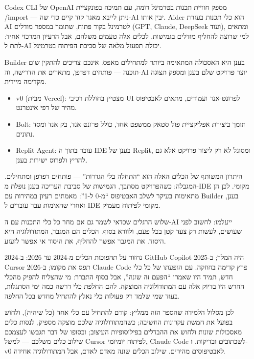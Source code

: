 
Codex CLI של OpenAI מספק חוויית תכנות בטרמינל דומה, עם תמיכה בפונקציית /import — ניתן לייבא מאגר קוד קיים כדי שה-AI יבין אותו. Aider הוא כלי תכנות בעזרת AI לטרמינל בקוד פתוח, שתומך במספר מודלים (GPT, Claude, DeepSeek ועוד), ומתאים למי שרוצה להחליף מודלים בגמישות. לכלים אלה טעמים משלהם, אבל הרעיון המרכזי אחיד: לתת ל-AI יכולת תפעול מלאה של סביבת הפיתוח בטרמינל.


Builder בענן היא האסכולה המתאימה ביותר למתחילים מאפס. אינכם צריכים להתקין שום תוכנה — פותחים דפדפן, מתארים את הדרישה, וה-AI יוצר פרויקט שלם בענן ומספק תצוגה מקדימה מיידית.

\begin{itemize}
  \item v0 (מבית Vercel): מצטיין בחוללת רכיבי UI לפרונט-אנד ועמודים, מתאים לאבטיפוס מהיר של דפי אינטרנט.
  \item Bolt: תומך ביצירת אפליקציית פול-סטאק ממשפט אחד, כולל פרונט-אנד, בק-אנד ומסד נתונים.
  \item Replit Agent: עובד בתוך ה-IDE בענן של Replit, ומסוגל לא רק ליצור פרויקט אלא גם להריץ ולפרוס ישירות בענן.
\end{itemize}

היתרון המשותף של הכלים האלה הוא “התחלה בלי הגדרות” — פותחים דפדפן ומתחילים. המגבלה: כשהפרויקט מסתבך, הגמישות של סביבת העריכה בענן נופלת מ-IDE מקומי. לכן הן מתאימות בעיקר לשלב האבטיפוס “מ-0 ל-1”: מאמתים רעיון במהירות עם Builder בענן, ואחרי שהאימות עבר עוברים ל-IDE מקומי לפיתוח מעמיק.


שלוש הרגלים שכדאי לשמר גם אם מחר כל כלי התכנות עם ה-AI ייעלמו: לחשוב לפני שעושים, לעשות רק צעד קטן בכל פעם, ולוודא בסוף. הכלים הם המגבר, המתודולוגיה היא היסוד. את המגבר אפשר להחליף, את היסוד אי אפשר לזעזע.

נחזור על תהפוכות הכלים מ-2024 עד 2026: ב-2024 GitHub Copilot היה המלך; ב-2025 Cursor תפס את מקומו; ב-2026 Claude Code פרץ קדימה בחוזקה. עם הופעתו של כל כלי חדש, תמיד היו שאמרו “הפעם זה שונה”, אבל בסוף התברר: מי שהצליח להפיק מהכלי החדש היו בדיוק אלה עם המתודולוגיה המוצקה. להם החלפת כלי דרשה כמה ימי הסתגלות, בעוד שמי שלמד רק פעולות כלי נאלץ להתחיל מחדש בכל החלפה.

לכן מסלול הלמידה שהספר הזה ממליץ: קודם להתחיל עם כלי אחד (כל שיהיה), ולחוש בפועל את חמשת עקרונות החשיבה; כשהמתודולוגיה שלכם מוצקה מספיק, לנסות כלים מאסכולות שונות ולחוש את ההבדלים בפילוסופיות העיצוב; ובסופו של דבר תגבשו לעצמכם שילוב כלים משלכם — למשל Cursor לפיתוח יומיומי, Claude Code לשכתובים ובדיקות, ו-v0 לאבטיפוסים מהירים. שילוב הכלים שונה מאדם לאדם, אבל המתודולוגיה אחידה.

